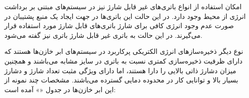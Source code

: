 \begin{latin}
\begin{center}
	\begin{table}[h!]
		\centering
		\caption{}
		\label{مقایسه باتری‌های قابل شارژ سیستم‌های iot}
	\end{table}
\end{center} 
\end{latin}




امکان استفاده از انواع باتری‌های غیر قابل شارژ نیز در سیستم‌های مبتنی بر برداشت انرژی از محیط وجود دارد. در این حالت این باتری‌ها در جهت ایجاد یک منبع پشتیبان در صورت عدم وجود انرژی کافی برای شارژ باتری‌های قابل شارژ مورد استفاده قرار می‌گیرند. در این حالت به باتری غیر قابل شارژ باتری  نیز گفته می‌شود.

نوع دیگر ذخیره‌سازهای انرژی الکتریکی پرکاربرد در سیستم‌های  ابر خازن‌ها هستند که دارای ظرفیت ذخیره‌سازی کمتری نسبت به باتری در سایز مشابه می‌باشند و همچنین میزان دشارژ ذاتی بالایی را دارا هستند، اما دارای ویژگی مثبت تعداد شارژ و دشارژ بسیار بالا و توانایی کار در محدوده دمایی گسترده می‌باشند. مشخصات چند نمونه از این ابر خازن‌ها در جدول «» آمده است:



